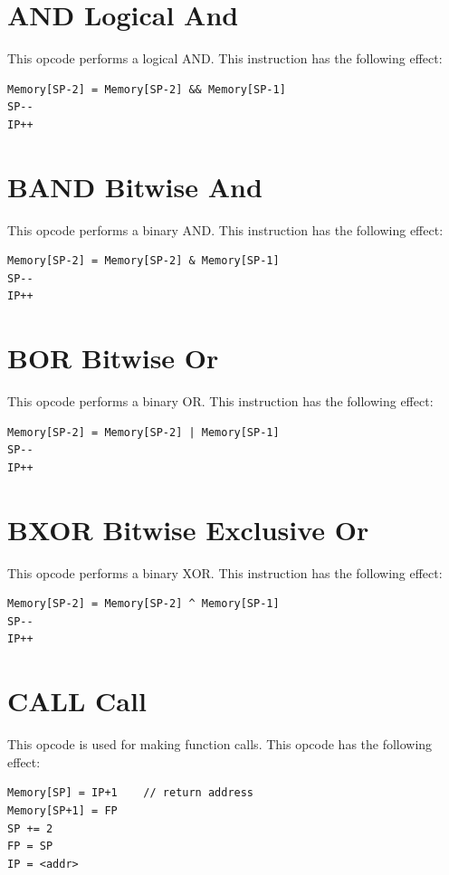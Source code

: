\documentclass[11pt,a4paper,oneside]{book}
\begin{document}
\pagebreak
\section[AND]{\texorpdfstring{AND \hfill Logical And}{AND -- Logical And}}
This opcode performs a logical AND. This instruction has the following effect:
\begin{verbatim}
Memory[SP-2] = Memory[SP-2] && Memory[SP-1]
SP--
IP++
\end{verbatim}

\pagebreak
\section[BAND]{\texorpdfstring{BAND \hfill Bitwise And}{BAND -- Bitwise And}}
This opcode performs a binary AND. This instruction has the following effect:
\begin{verbatim}
Memory[SP-2] = Memory[SP-2] & Memory[SP-1]
SP--
IP++
\end{verbatim}

\pagebreak
\section[BOR]{\texorpdfstring{BOR \hfill Bitwise Or}{BOR -- Bitwise Or}}
This opcode performs a binary OR. This instruction has the following effect:
\begin{verbatim}
Memory[SP-2] = Memory[SP-2] | Memory[SP-1]
SP--
IP++
\end{verbatim}

\pagebreak
\section[BXOR]{\texorpdfstring{BXOR \hfill Bitwise Exclusive Or}{BXOR -- Bitwise Exclusive Or}}
This opcode performs a binary XOR. This instruction has the following effect:
\begin{verbatim}
Memory[SP-2] = Memory[SP-2] ^ Memory[SP-1]
SP--
IP++
\end{verbatim}

\pagebreak
\section[CALL]{\texorpdfstring{CALL \hfill Call}{CALL -- Call}}
This opcode is used for making function calls. This opcode has the following effect:
\begin{verbatim}
Memory[SP] = IP+1    // return address
Memory[SP+1] = FP
SP += 2
FP = SP
IP = <addr>
\end{verbatim}
\end{document}
